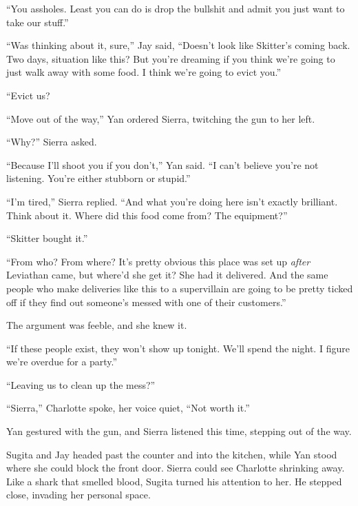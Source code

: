 ``You assholes.  Least you can do is drop the bullshit and admit you just want to take our stuff.''



``Was thinking about it, sure,'' Jay said, ``Doesn't look like Skitter's coming back.  Two days, situation like this?  But you're dreaming if you think we're going to just walk away with some food.  I think we're going to evict you.''



``Evict us?



``Move out of the way,'' Yan ordered Sierra, twitching the gun to her left.



``Why?'' Sierra asked.



``Because I'll shoot you if you don't,'' Yan said.  ``I can't believe you're not listening.  You're either stubborn or stupid.''



``I'm tired,'' Sierra replied.  ``And what you're doing here isn't exactly brilliant.  Think about it. Where did this food come from?  The equipment?''



``Skitter bought it.''



``From who?  From where?  It's pretty obvious this place was set up \emph{after} Leviathan came, but where'd she get it?  She had it delivered.  And the same people who make deliveries like this to a supervillain are going to be pretty ticked off if they find out someone's messed with one of their customers.''



The argument was feeble, and she knew it.



``If these people exist, they won't show up tonight.  We'll spend the night.  I figure we're overdue for a party.''



``Leaving us to clean up the mess?''



``Sierra,'' Charlotte spoke, her voice quiet, ``Not worth it.''



Yan gestured with the gun, and Sierra listened this time, stepping out of the way.



Sugita and Jay headed past the counter and into the kitchen, while Yan stood where she could block the front door.  Sierra could see Charlotte shrinking away.  Like a shark that smelled blood, Sugita turned his attention to her.  He stepped close, invading her personal space.



